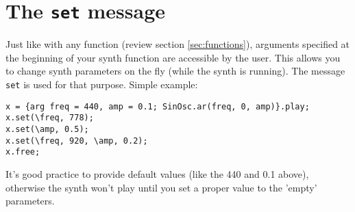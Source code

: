 \section{The \texttt{set} message}

Just like with any function (review section \ref{sec:functions}), arguments specified at the beginning of your synth function are accessible by the user. This allows you to change synth parameters on the fly (while the synth is running). The message \texttt{set} is used for that purpose. Simple example:

\begin{lstlisting}[style=SuperCollider-IDE, basicstyle=\scttfamily\footnotesize]
x = {arg freq = 440, amp = 0.1; SinOsc.ar(freq, 0, amp)}.play;
x.set(\freq, 778);
x.set(\amp, 0.5);
x.set(\freq, 920, \amp, 0.2);
x.free;
\end{lstlisting}

It's good practice to provide default values (like the 440 and 0.1 above), otherwise the synth won't play until you set a proper value to the 'empty' parameters.
